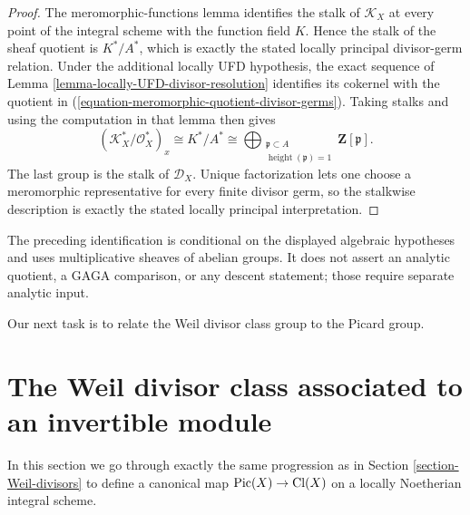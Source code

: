 \begin{proof}
The meromorphic-functions lemma identifies the stalk of $\mathcal{K}_X$ at
every point of the integral scheme with the function field $K$. Hence the
stalk of the sheaf quotient is $K^*/A^*$, which is exactly the stated
locally principal divisor-germ relation. Under the additional locally UFD
hypothesis, the exact sequence of Lemma
\ref{lemma-locally-UFD-divisor-resolution} identifies its cokernel with
the quotient in (\ref{equation-meromorphic-quotient-divisor-germs}).
Taking stalks and using the computation in that lemma then gives
\[
(\mathcal{K}_X^*/\mathcal{O}_X^*)_x \cong K^*/A^*
\cong
\bigoplus_{\substack{\mathfrak p \subset A\\
\operatorname{height}(\mathfrak p)=1}}
\mathbf Z[\mathfrak p].
\]
The last group is the stalk of $\mathcal{D}_X$. Unique factorization lets
one choose a meromorphic representative for every finite divisor germ, so
the stalkwise description is exactly the stated locally principal
interpretation.
\end{proof}

\begin{remark}
\label{remark-meromorphic-quotient-algebraic-boundary}
The preceding identification is conditional on the displayed algebraic
hypotheses and uses multiplicative sheaves of abelian groups. It does not
assert an analytic quotient, a GAGA comparison, or any descent statement;
those require separate analytic input.
\end{remark}

Our next task is to relate the Weil divisor class group to the Picard group.





\section{The Weil divisor class associated to an invertible module}
\label{section-c1}

\noindent
In this section we go through exactly the same progression as in
Section \ref{section-Weil-divisors} to define a canonical map
$\mathop{\mathrm{Pic}}\nolimits(X) \to \text{Cl}(X)$
on a locally Noetherian integral scheme.

